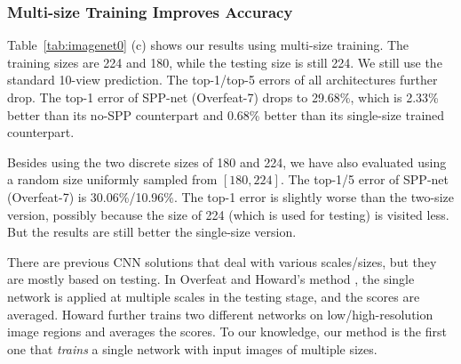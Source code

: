 \documentclass[10pt,journal,cspaper,compsoc]{IEEEtran}
\begin{document}
\subsubsection{Multi-size Training Improves Accuracy}

Table~\ref{tab:imagenet0} (c) shows our results using multi-size training. The training sizes are 224 and 180, while the testing size is still 224. We still use the standard 10-view prediction. The top-1/top-5 errors of all architectures further drop. The top-1 error of SPP-net (Overfeat-7) drops to 29.68\%, which is 2.33\% better than its no-SPP counterpart and 0.68\% better than its single-size trained counterpart.

Besides using the two discrete sizes of 180 and 224, we have also evaluated using a random size uniformly sampled from $[180, 224]$. The top-1/5 error of SPP-net (Overfeat-7) is 30.06\%/10.96\%. The top-1 error is slightly worse than the two-size version, possibly because the size of 224 (which is used for testing) is visited less.
But the results are still better the single-size version.

There are previous CNN solutions \cite{Sermanet2013,Howard2013} that deal with various scales/sizes,
but they are mostly based on testing.
In Overfeat \cite{Sermanet2013} and Howard's method \cite{Howard2013}, the single network is applied at multiple scales in the testing stage, and the scores are averaged. Howard further trains two different networks on low/high-resolution image regions and averages the scores. To our knowledge, our method is the first one that \emph{trains} a single network with input images of multiple sizes.
\end{document}
